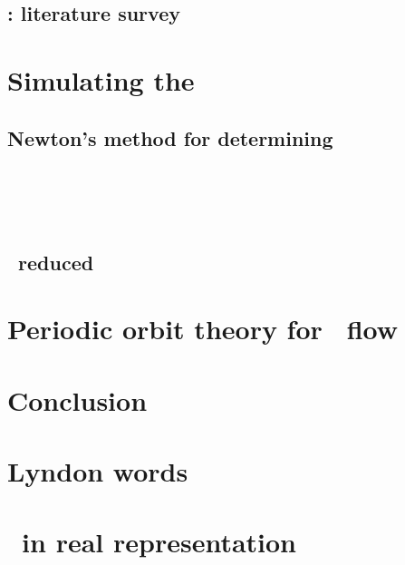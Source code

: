     \section{\KS: literature survey}
        \label{sec:KSlit}
        



\chapter{Simulating the \KSe}
\label{chap:Numerics}
    \section{Newton's method for determining \reqva}
        


\chapter{\KS\ \statesp}
    \section{\KS\ reduced \statesp}
	
\chapter{Periodic orbit theory for \KS\ flow}

\chapter{Conclusion}


\appendix

\chapter{Lyndon words}


\chapter{\KSe\ in real representation}

